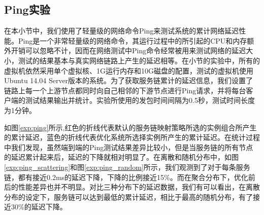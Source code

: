 \subsection{Ping实验}
在本小节中，我们使用了轻量级的网络命令Ping来测试系统的累计网络延迟性能。Ping是一个非常轻量级的网络命令，其运行过程中的所引起的CPU和内存额外开销可以忽略不计，因而在网络测试中Ping命令经常被用来测试网络的延迟大小，测试的结果基本与真实网络链路上产生的延迟相等。在小节的实验中，所有的虚拟机依然采用单个虚拟核、1G运行内存和10G磁盘的配置，测试的虚拟机使用Ubuntu 14.04 Server版本的系统。为了获取服务链累计的延迟信息，我们设置了链路上每一个上游节点都同时向自己相邻的下游节点进行Ping请求，并将每台客户端的测试结果输出并统计。实验所使用的发包时间间隔为0.5秒，测试时间长度为1分钟。
\begin{figure}[!htp]
	\centering
	
\end{figure}
\begin{figure}
	\addtocounter{subfigure}{2}
	\ContinuedFloat
	\centering

\end{figure}

如图\ref{exp:ping}所示,红色的折线代表默认的服务链映射策略所选的实例组合所产生的累计延迟，蓝色的折线代表优化系统所选择实例所产生的累计延迟。在统计过程中我们发现，虽然端到端的Ping测试结果差异比较小，但是当服务链的所有节点的延迟累计起来后，延迟的下降就相对明显了。在离散和随机分布中，如图\ref{exp:ping_scattering}和图\ref{exp:ping_random}所示，我们观测到了对于每条服务链，都有接近0.2ms的延迟下降，下降的比例接近15\%。而在聚合分布下，优化前后的性能差异也并不明显。对比三种分布下的延迟数据，我们有可以看出，在离散分布的设定下，服务链可以达到最低的累计延迟，相比于最高的随机分布，有了接近30\%的延迟下降。


